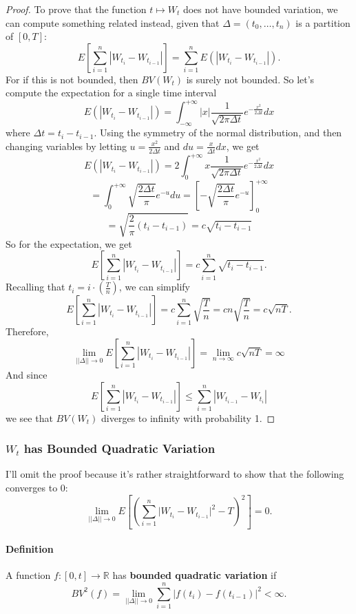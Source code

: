 \documentclass[12pt]{article}
\theoremstyle{plain}
\theoremstyle{definition}
\theoremstyle{remark}
\begin{document}
      \begin{proof}
	 To prove that the function $t \mapsto W_t$ does not have bounded
	 variation, we can compute something related instead, given that
	 $\Delta = (t_0, \ldots, t_n)$ is a partition of $[0,T]$:
	    \[E\left[\sum^n_{i=1} |W_{t_i} - W_{t_{i-1}}|\right] =
	       \sum^n_{i=1} E(|W_{t_i} - W_{t_{i-1}}|) .\]
	 For if this is not bounded, then $BV(W_t)$ is surely not
	 bounded. So let's compute the expectation for a single time
	 interval
	 \[E(|W_{t_i} - W_{t_{i-1}}|) = \int^{+\infty}_{-\infty}
	    |x| \frac{1}{\sqrt{2\pi \Delta t}} e^{-\frac{x^2}{2\Delta t}}
	    dx \]
	 where $\Delta t = t_i - t_{i-1}$. Using the symmetry of the
	 normal distribution, and then changing variables by letting
	 $u = \frac{x^2}{2\Delta t}$ and $du=\frac{x}{\Delta t}dx$,
	 we get
	    \[ E(|W_{t_i} - W_{t_{i-1}}|) = 2 \int^{+\infty}_{0}
	       x\frac{1}{\sqrt{2\pi \Delta t}} e^{-\frac{x^2}{2\Delta t}}
	       dx \]
	    \[ = \int^{+\infty}_{0} \sqrt{\frac{2 \Delta t}{\pi}}
	       e^{-u} du = \left[ -\sqrt{\frac{2 \Delta t}{\pi}} e^{-u}
	       \right]^{+\infty}_{0} \]
	    \[ = \sqrt{\frac{2}{\pi} (t_i - t_{i-1})}
	       = c\sqrt{t_i-t_{i-1}}  \]
	 So for the expectation, we get
	    \[ E\left[\sum^n_{i=1} |W_{t_i} - W_{t_{i-1}}|\right]
	       = c \sum_{i=1}^n \sqrt{t_i - t_{i-1}}.\]
	 Recalling that $t_i = i \cdot (\frac{T}{n})$, we can simplify
	    \[ E\left[\sum^n_{i=1} |W_{t_i} - W_{t_{i-1}}|\right]  =
	       c \sum_{i=1}^n \sqrt{\frac{T}{n}} =cn\sqrt{\frac{T}{n}} =
	       c\sqrt{nT}.\]
	 Therefore,
	    \[ \lim_{||\Delta|| \rightarrow 0} E\left[\sum^n_{i=1}
	       |W_{t_i}-W_{t_{i-1}}|\right]=\lim_{n\rightarrow \infty}
	       c\sqrt{nT} = \infty \]
	 And since
	    \[E\left[\sum^n_{i=1}|W_{t_i}-W_{t_{i-1}}|\right] \leq
	       \sum^n_{i=1} |W_{t_{i-1}} - W_{t_i}| \]
	 we see that $BV(W_t)$ diverges to infinity with probability 1.
      \end{proof}

\subsubsection{$W_t$ has Bounded Quadratic Variation}

      I'll omit the proof because it's rather
      straightforward to show that the following converges to 0:
      \[ \lim_{||\Delta || \rightarrow 0} E\left[ \left(\sum_{i=1}^n
	 \lvert W_{t_i} - W_{t_{i-1}} \rvert^2 -T\right)^2 \right]=0.\]

      \paragraph{Definition} A function $f: [0,t] \rightarrow \mathbb{R}$
      has \textbf{bounded quadratic variation} if
	 \[ BV^2(f) = \lim_{||\Delta|| \rightarrow 0} \sum^n_{i=1}
	    \left\lvert f(t_i) - f(t_{i-1}) \right\rvert^2 < \infty.\]
\end{document}
